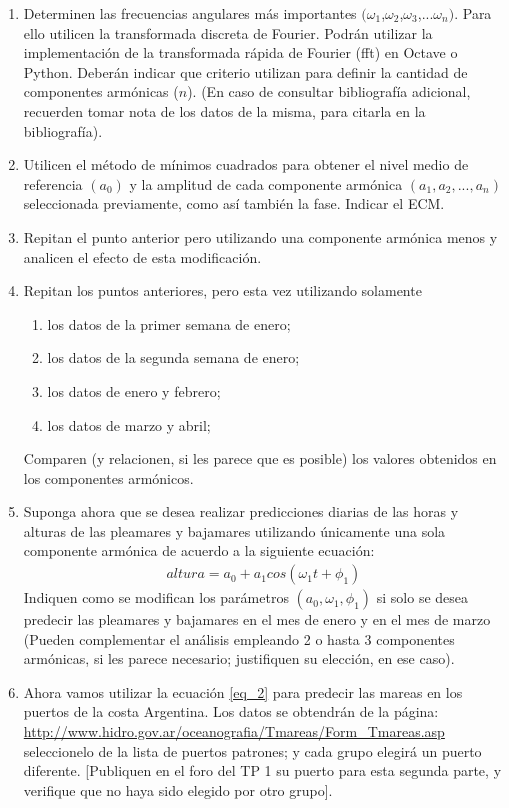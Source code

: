 \documentclass[10pt,a4paper]{article}
\numberwithin{equation}{section}
\numberwithin{figure}{section}
\numberwithin{table}{section}
\begin{document}
\begin{enumerate}
    \item 
    Determinen las frecuencias angulares más importantes $(\omega_1$,$\omega_2$,$\omega_3$,...$\omega_n)$. Para ello utilicen la transformada discreta de Fourier. Podrán utilizar la implementación de la transformada rápida de Fourier (fft) en Octave o Python. Deberán indicar que criterio utilizan para definir la cantidad de componentes armónicas ($n$). (En caso de consultar bibliografía adicional, recuerden tomar nota de los datos de la misma, para citarla en la bibliografía).
    \item
    Utilicen el método de mínimos cuadrados para obtener el nivel medio de referencia $(a_0)$ y la amplitud de cada componente armónica $(a_1,a_2,...,a_n)$ seleccionada previamente, como así también la fase. Indicar el ECM.
    \item
    Repitan el punto anterior pero utilizando una componente armónica menos y analicen el efecto de esta modificación.
    \item
    Repitan los puntos anteriores, pero esta vez utilizando solamente 
    \begin{enumerate}
        \item
        los datos de la primer semana de enero;
        \item
        los datos de la segunda semana de enero;
        \item
        los datos de enero y febrero;
        \item
        los datos de marzo y abril;
    \end{enumerate}
    Comparen (y relacionen, si les parece que es posible) los valores obtenidos en los componentes armónicos.
    \item
    Suponga ahora que se desea realizar predicciones diarias de las horas y alturas de las pleamares y bajamares utilizando únicamente una sola componente armónica de acuerdo a la siguiente ecuación:
    \begin{equation}\label{eq_2}
        \begin{split}
            altura = a_0 + a_1 cos(\omega_1 t + \phi_1)
        \end{split}
    \end{equation}
    Indiquen como se modifican los parámetros $(a_0,\omega_1,\phi_1)$ si solo se desea predecir las pleamares y bajamares en el mes de enero y en el mes de marzo
    (Pueden complementar el análisis empleando 2 o hasta 3 componentes armónicas, si les parece necesario; justifiquen su elección, en ese caso).
    \item
    Ahora vamos utilizar la ecuación \ref{eq_2} para predecir las mareas en los puertos de la costa Argentina.
    Los datos se obtendrán de la página:
    \url{http://www.hidro.gov.ar/oceanografia/Tmareas/Form_Tmareas.asp} seleccionelo de la lista de puertos patrones; y cada grupo elegirá un puerto diferente. [Publiquen en el foro del TP 1 su puerto para esta segunda parte, y verifique que no haya sido elegido por otro grupo].
    

\end{enumerate}
\end{document}
